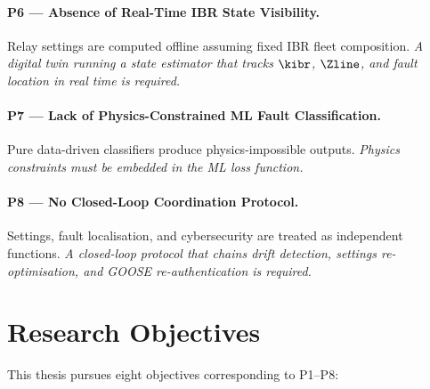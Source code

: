 \paragraph{P6 --- Absence of Real-Time IBR State Visibility.}
Relay settings are computed offline assuming fixed IBR fleet composition.
\emph{A digital twin running a state estimator that tracks $\kibr$,
$\Zline$, and fault location in real time is required.}

\paragraph{P7 --- Lack of Physics-Constrained ML Fault Classification.}
Pure data-driven classifiers produce physics-impossible outputs. \emph{Physics
constraints must be embedded in the ML loss function.}

\paragraph{P8 --- No Closed-Loop Coordination Protocol.}
Settings, fault localisation, and cybersecurity are treated as independent
functions. \emph{A closed-loop protocol that chains drift detection, settings
re-optimisation, and GOOSE re-authentication is required.}

\section{Research Objectives}
\label{sec:ch1_objectives}

This thesis pursues eight objectives corresponding to P1--P8:

